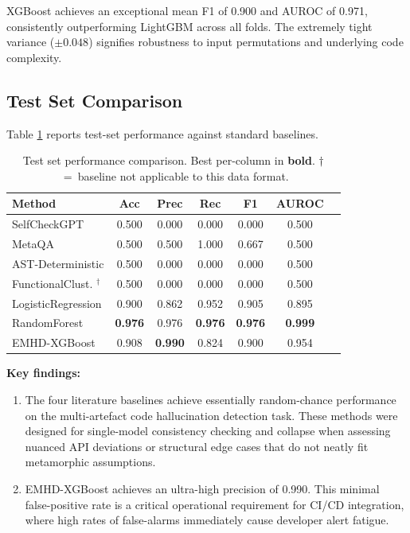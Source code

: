 \documentclass{svproc}
\begin{document}
XGBoost achieves an exceptional mean F1 of 0.900 and AUROC of 0.971, consistently outperforming LightGBM across all folds. The extremely tight variance ($\pm 0.048$) signifies robustness to input permutations and underlying code complexity.

\subsection{Test Set Comparison}

Table \ref{tab:comparison} reports test-set performance against standard baselines.

\begin{table}[t]
\centering
\caption{Test set performance comparison. Best per-column in \textbf{bold}. $\dagger$~=~baseline not applicable to this data format.}
\label{tab:comparison}
\begin{tabular}{lcccccc}
\toprule
\textbf{Method} & \textbf{Acc} & \textbf{Prec} & \textbf{Rec} & \textbf{F1} & \textbf{AUROC} \\
\midrule
SelfCheckGPT \cite{manakul2023selfcheckgpt}     & 0.500 & 0.000 & 0.000 & 0.000 & 0.500 \\
MetaQA \cite{yang2025metaqa}                     & 0.500 & 0.500 & 1.000 & 0.667 & 0.500 \\
AST-Deterministic \cite{khati2026ast}            & 0.500 & 0.000 & 0.000 & 0.000 & 0.500 \\
FunctionalClust. \cite{ravuri2025clustering}$^\dagger$ & 0.500 & 0.000 & 0.000 & 0.000 & 0.500 \\
\midrule
LogisticRegression & 0.900 & 0.862 & 0.952 & 0.905 & 0.895 \\
RandomForest       & \textbf{0.976} & 0.976 & \textbf{0.976} & \textbf{0.976} & \textbf{0.999} \\
EMHD-XGBoost  & 0.908 & \textbf{0.990} & 0.824 & 0.900 & 0.954 \\
\bottomrule
\end{tabular}
\end{table}

\noindent\textbf{Key findings:}
\begin{enumerate}
\item The four literature baselines achieve essentially random-chance performance on the multi-artefact code hallucination detection task. These methods were designed for single-model consistency checking and collapse when assessing nuanced API deviations or structural edge cases that do not neatly fit metamorphic assumptions.
\item EMHD-XGBoost achieves an ultra-high precision of 0.990. This minimal false-positive rate is a critical operational requirement for CI/CD integration, where high rates of false-alarms immediately cause developer alert fatigue.
\end{enumerate}
\end{document}
